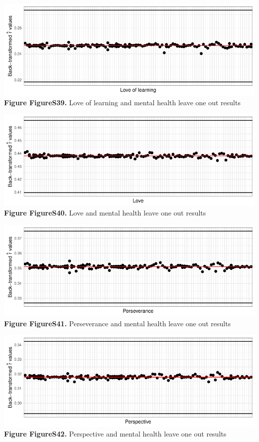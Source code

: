\documentclass[
  letterpaper,
  DIV=11,
  numbers=noendperiod]{scrartcl}
\begin{document}
\includegraphics{SupplementaryResults_files/figure-pdf/unnamed-chunk-12-15.pdf}\textbf{Figure
FigureS39.} Love of learning and mental health leave one out results

\includegraphics{SupplementaryResults_files/figure-pdf/unnamed-chunk-12-16.pdf}\textbf{Figure
FigureS40.} Love and mental health leave one out results

\includegraphics{SupplementaryResults_files/figure-pdf/unnamed-chunk-12-17.pdf}\textbf{Figure
FigureS41.} Perseverance and mental health leave one out results

\includegraphics{SupplementaryResults_files/figure-pdf/unnamed-chunk-12-18.pdf}\textbf{Figure
FigureS42.} Perspective and mental health leave one out results
\end{document}
